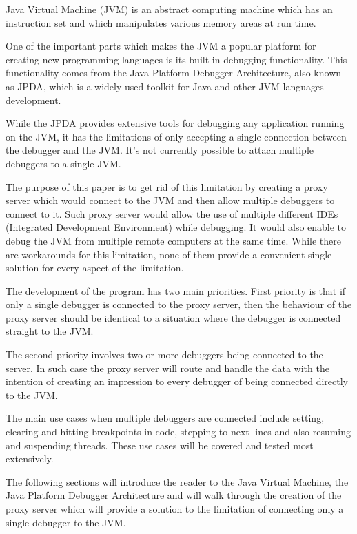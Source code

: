 \documentclass[..thesis.tex]{subfiles}
\begin{document}

Java Virtual Machine (JVM) is an abstract computing machine which has an instruction set and which manipulates various memory areas at run time.\cite{oracle_jvm_spec}

One of the important parts which makes the JVM a popular platform for creating new programming languages is its built-in debugging functionality. 
This functionality comes from the Java Platform Debugger Architecture, also known as JPDA, which is a widely used toolkit for Java and other JVM languages development.

While the JPDA provides extensive tools for debugging any application running on the JVM, it has the limitations of only accepting a single connection between the debugger and the JVM. 
It's not currently possible to attach multiple debuggers to a single JVM.


The purpose of this paper is to get rid of this limitation by creating a proxy server which would connect to the JVM and then allow multiple debuggers to connect to it. 
Such proxy server would allow the use of multiple different IDEs (Integrated Development Environment) while debugging. 
It would also enable to debug the JVM from multiple remote computers at the same time. 
While there are workarounds for this limitation, none of them provide a convenient single solution for every aspect of the limitation. 


The development of the program has two main priorities. 
First priority is that if only a single debugger is connected to the proxy server, then the behaviour of the proxy server should be identical to a situation where the debugger is connected straight to the JVM.

The second priority involves two or more debuggers being connected to the server. 
In such case the proxy server will route and handle the data with the intention of creating an impression to every debugger of being connected directly to the JVM.

The main use cases when multiple debuggers are connected include setting, clearing and hitting breakpoints in code, stepping to next lines and also resuming and suspending threads.
These use cases will be covered and tested most extensively.

The following sections will introduce the reader to the Java Virtual Machine, the Java Platform Debugger Architecture and will walk through the creation of the proxy server which will provide a solution to the limitation of connecting only a single debugger to the JVM.
\end{document}
